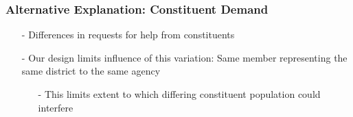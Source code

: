 \documentclass[xcolor=dvipsnames]{beamer}
\begin{document}
\begin{frame}[plain]
\begin{center}
\end{center}
\end{frame}
\begin{frame}[plain]
\begin{center}
\end{center}
\end{frame}
\begin{frame}[plain]
\begin{center}
\end{center}
\end{frame}
\begin{frame}
\frametitle{Alternative Explanation: Constituent Demand}
\begin{itemize}
\item[-] Differences in requests for help from constituents
\item[-] Our design limits influence of this variation: Same member representing the same district to the same agency
\begin{itemize}
\item[-] This limits extent to which differing constituent population could interfere
\end{itemize}
\end{itemize}
\end{frame}
\end{document}
